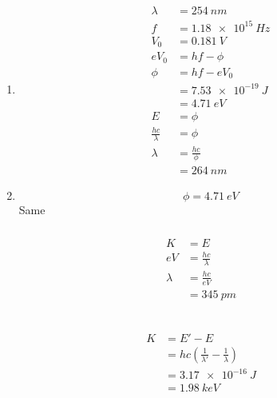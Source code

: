 \documentclass{article}
\begin{document}
\begin{enumerate}
  \item

        \begin{align*}
          \lambda             & = \qty{254}{nm}     \\
          f                   & = \qty{1.18e15}{Hz} \\
          V_0                 & = \qty{0.181}{V}    \\
          e V_0               & = h f - \phi        \\
          \phi                & = h f - e V_0       \\
                              & = \qty{7.53e-19}{J} \\
                              & = \qty{4.71}{eV}    \\
          E                   & = \phi              \\
          \frac{h c}{\lambda} & = \phi              \\
          \lambda             & = \frac{h c}{\phi}  \\
                              & = \qty{264}{nm}
        \end{align*}

  \item \[\phi = \qty{4.71}{eV}\] Same
\end{enumerate}

\setcounter{subsubsection}{12}
\subsubsection{}

\begin{align*}
  K       & = E                   \\
  e V     & = \frac{h c}{\lambda} \\
  \lambda & = \frac{h c}{e V}     \\
          & = \qty{345}{pm}       \\ \\
\end{align*}

\setcounter{subsubsection}{14}
\subsubsection{}

\begin{align*}
  K & = E' - E                                                    \\
    & = h c \left( \frac{1}{\lambda'} - \frac{1}{\lambda} \right) \\
    & = \qty{3.17e-16}{J}                                         \\
    & = \qty{1.98}{keV}
\end{align*}
\end{document}
